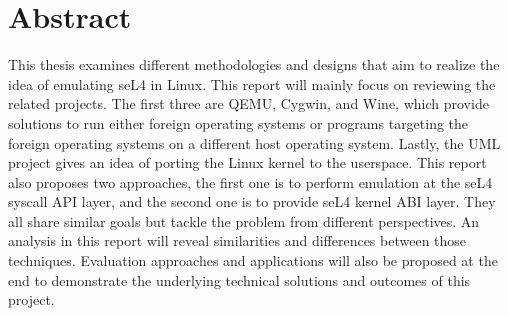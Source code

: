 \chapter*{Abstract}\label{abstract}

This thesis examines different methodologies and designs that aim to realize the idea of emulating seL4 in Linux. This report will mainly focus on reviewing the related projects. The first three are QEMU, Cygwin, and Wine, which provide solutions to run either foreign operating systems or programs targeting the foreign operating systems on a different host operating system. Lastly, the UML project gives an idea of porting the Linux kernel to the userspace. This report also proposes two approaches, the first one is to perform emulation at the seL4 syscall API layer, and the second one is to provide seL4 kernel ABI layer. They all share similar goals but tackle the problem from different perspectives. An analysis in this report will reveal similarities and differences between those techniques. Evaluation approaches and applications will also be proposed at the end to demonstrate the underlying technical solutions and outcomes of this project.
